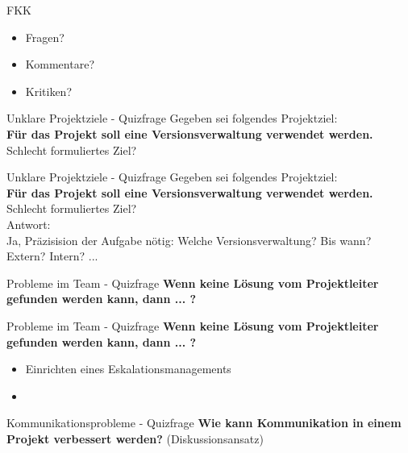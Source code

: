 \documentclass[12pt]{beamer}
\begin{document}
	\begin{frame}{FKK}
		\begin{itemize}
			\item{Fragen?}
			\item{Kommentare?}
			\item{Kritiken?}
		\end{itemize}

	\end{frame}	
	

	
	\begin{frame}{Unklare Projektziele - Quizfrage}
		Gegeben sei folgendes Projektziel:\\
		\textbf{Für das Projekt soll eine Versionsverwaltung verwendet werden.} \\
		Schlecht formuliertes Ziel? \\
	\end{frame}

	\begin{frame}{Unklare Projektziele - Quizfrage}
		Gegeben sei folgendes Projektziel:\\
		\textbf{Für das Projekt soll eine Versionsverwaltung verwendet werden.} \\
		Schlecht formuliertes Ziel? \\
		Antwort: \\
		Ja, Präzisision der Aufgabe nötig: Welche Versionsverwaltung? Bis wann? Extern? Intern? ... 
	\end{frame}
	
	\begin{frame}{Probleme im Team - Quizfrage}
		\textbf{Wenn keine Lösung vom Projektleiter gefunden werden kann, dann ... ?}
	\end{frame}
	
	\begin{frame}{Probleme im Team - Quizfrage}
		\textbf{Wenn keine Lösung vom Projektleiter gefunden werden kann, dann ... ?}
		\begin{itemize}
			\item{Einrichten eines Eskalationsmanagements}
			\item{}
		\end{itemize}

	\end{frame}

	\begin{frame}{Kommunikationsprobleme - Quizfrage}
		\textbf{Wie kann Kommunikation in einem Projekt verbessert werden?} (Diskussionsansatz)
	\end{frame}
\end{document}
